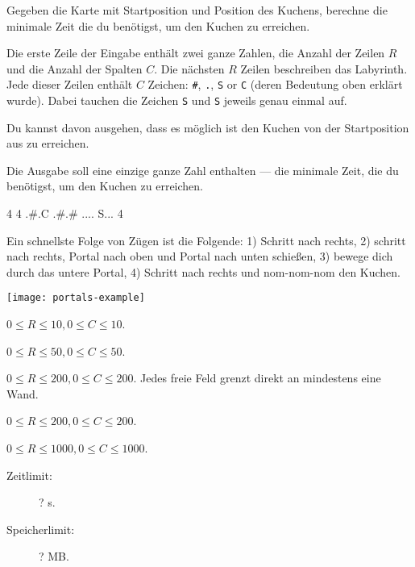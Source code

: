 \documentclass{boi2014-de}
\newcommand{\constant}[1]{{\tt #1}}
\begin{document}
    \Task
    Gegeben die Karte mit Startposition und Position des Kuchens, berechne die minimale Zeit die du benötigst, um den Kuchen zu erreichen.

    \Input
    Die erste Zeile der Eingabe enthält zwei ganze Zahlen, die Anzahl der Zeilen $R$ und die Anzahl der Spalten $C$.
    Die nächsten $R$ Zeilen beschreiben das Labyrinth. Jede dieser Zeilen enthält $C$ Zeichen: \constant{\#},
    \constant{.}, \constant{S} or \constant{C} (deren Bedeutung oben erklärt wurde).
    Dabei tauchen die Zeichen \constant{S} und \constant{S} jeweils genau einmal auf.
    
    Du kannst davon ausgehen, dass es möglich ist den Kuchen von der Startposition aus zu erreichen.

    \Output
    Die Ausgabe soll eine einzige ganze Zahl enthalten --- die minimale Zeit, die du benötigst, um den Kuchen zu erreichen.

    \Example
    \example
    {
        4 4\newline
        .\#.C\newline
        .\#.\#\newline
        ....\newline
        S...
    }
    {
        4
    }
    {
        Ein schnellste Folge von Zügen ist die Folgende: 1) Schritt nach rechts, 2) schritt nach rechts, Portal nach oben und Portal nach unten schießen, 3) bewege dich durch das untere Portal, 4) Schritt nach rechts und nom-nom-nom den Kuchen.

        \begin{center}
            \texttt{[image: portals-example]}
        \end{center}
    }

    \Scoring

    \begin{description}[leftmargin=0pt]
        \item[Teilaufgabe 1 (? points):] $0 \le R \le 10, 0 \le C \le 10$.
        \item[Teilaufgabe 2 (? points):] $0 \le R \le 50, 0 \le C \le 50$.
        \item[Teilaufgabe 3 (? points):] $0 \le R \le 200, 0 \le C \le 200$.
        Jedes freie Feld grenzt direkt an mindestens eine Wand.
        \item[Teilaufgabe 4 (? points):] $0 \le R \le 200, 0 \le C \le 200$.
        \item[Teilaufgabe 5 (? points):] $0 \le R \le 1000, 0 \le C \le 1000$.
    \end{description}

    \Constraints

    \begin{description}
        \item[Zeitlimit:] ? s.
        \item[Speicherlimit:] ? MB.
    \end{description}
\end{document}
